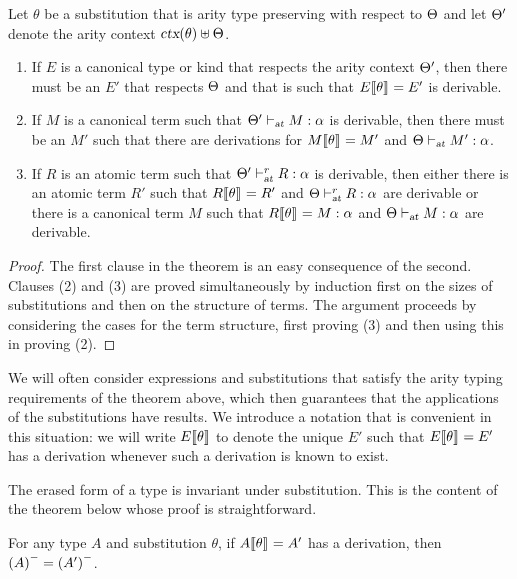 \begin{theorem}\label{th:aritysubs}
Let $\theta$ be a substitution that is arity type preserving with
respect to $\Theta$ and let $\Theta'$ denote the arity context 
$\mbox{\sl ctx}(\theta) \uplus \Theta$. 
%
\begin{enumerate}
\item If $E$ is a canonical type or kind that respects the
  arity context $\Theta'$, then there must be an $E'$ that
  respects $\Theta$ and that is such that $E\llbracket {\theta} \rrbracket_{} = E'$
  is derivable. 

\item If $M$ is a canonical term such that
$\Theta' \vdash_{\mbox{\sl \scriptsize at}} M : \alpha$ is
derivable, then there must be an $M'$ such that there are derivations
for $M\llbracket {\theta} \rrbracket_{} = M'$ and $\Theta \vdash_{\mbox{\sl \scriptsize at}} M' : \alpha$.

\item If $R$ is an atomic term such that
  $\Theta' \vdash^r_{\mbox{\sl\scriptsize at}} R : \alpha$
  is derivable, then either there is an atomic term $R'$ such that
  $R\llbracket {\theta} \rrbracket_{} = R'$ and $\Theta \vdash^r_{\mbox{\sl\scriptsize at}} R : \alpha$ are
  derivable or there is a canonical term $M$ such that
  $R\llbracket {\theta} \rrbracket_{} = M : \alpha$ and
  $\Theta \vdash_{\mbox{\sl \scriptsize at}} M : \alpha$ are derivable. 
\end{enumerate}
\end{theorem}
\begin{proof}
The first clause in the theorem is an easy consequence of the
second. Clauses (2) and (3) are proved simultaneously by induction
first on the sizes of substitutions and then on the structure of
terms.
% 
The argument proceeds by considering the cases for the term structure,
first proving (3) and then using this in proving (2). 
\end{proof}

We will often consider expressions and substitutions that satisfy the
arity typing requirements of the theorem above, which then guarantees
that the applications of the substitutions have results.  
%
We introduce a notation that is convenient in this situation: we will
write $E\llbracket {\theta} \rrbracket$ to denote the unique $E'$ such that
$E\llbracket {\theta} \rrbracket_{} = E'$ has a derivation whenever such a derivation is
known to exist.


The erased form of a type is invariant under substitution. This is the
content of the theorem below whose proof is straightforward.

\begin{theorem}\label{th:erasure}
For any type $A$ and substitution $\theta$, if $A\llbracket {\theta} \rrbracket_{} = A'$
has a derivation, then ${(A)}^{-} = {(A')}^{-}$.
\end{theorem}

